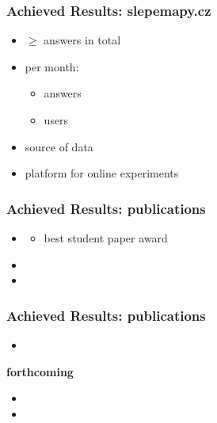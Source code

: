 \documentclass[xcolor=svgnames]{beamer}
\begin{document}
\begin{frame}
	\frametitle{Achieved Results: slepemapy.cz}
	\begin{itemize}
		\item $\geq$  answers in total
		\item per month:
			\begin{itemize}
				\item {} answers
				\item {} users
			\end{itemize}
	\end{itemize}

	\medskip
	\begin{itemize}
		\item source of data
		\item platform for online experiments
	\end{itemize}
\end{frame}
\begin{frame}
	\frametitle{Achieved Results: publications}
	\begin{itemize}
		\item {}
		\begin{itemize}
			\item best student paper award
		\end{itemize}
		\item {}
		\item {}
	\end{itemize}
\end{frame}
\begin{frame}
	\frametitle{Achieved Results: publications}
	\begin{itemize}
		\item {}
	\end{itemize}
	\textbf{forthcoming}
	\begin{itemize}
		\item {}
		\item {}
	\end{itemize}
\end{frame}
\end{document}
